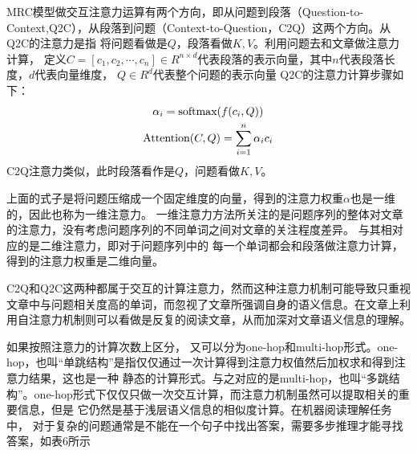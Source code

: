 \documentclass{article}
\newcommand{\upcite}[1]{\textsuperscript{\textsuperscript{\cite{#1}}}}
\begin{document}
MRC模型做交互注意力运算有两个方向，即从问题到段落（Question-to-Context,Q2C），从段落到问题（Context-to-Question，C2Q）这两个方向。从Q2C的注意力是指
将问题看做是$Q$，段落看做$K,V$。利用问题去和文章做注意力计算，
定义$C=[c_1,c_2,\cdots,c_n] \in R^{n\times d}$代表段落的表示向量，其中$n$代表段落长度，$d$代表向量维度，
$Q\in R^{d}$代表整个问题的表示向量
Q2C的注意力计算步骤如下：
\begin{gather}
\alpha_i=\text{softmax}(f(c_i,Q)) \notag \\
\text{Attention}(C,Q)=\sum_{i=1}^{n}\alpha_{i}c_i \notag 
\end{gather}
C2Q注意力类似，此时段落看作是$Q$，问题看做$K,V$。

上面的式子是将问题压缩成一个固定维度的向量，得到的注意力权重$\alpha$也是一维的，因此也称为一维注意力。
一维注意力方法所关注的是问题序列的整体对文章的注意力，没有考虑问题序列的不同单词之间对文章的关注程度差异。
与其相对应的是二维注意力，即对于问题序列中的
每一个单词都会和段落做注意力计算，得到的注意力权重是二维向量。

C2Q和Q2C这两种都属于交互的计算注意力，然而这种注意力机制可能导致只重视文章中与问题相关度高的单词，而忽视了文章所强调自身的语义信息。在文章上利用自注意力机制则可以看做是反复的阅读文章，从而加深对文章语义信息的理解。








如果按照注意力的计算次数上区分，
又可以分为one-hop和multi-hop形式。one-hop，也叫“单跳结构”是指仅仅通过一次计算得到注意力权值然后加权求和得到注意力结果，这也是一种
静态的计算形式。与之对应的是multi-hop，也叫“多跳结构”。one-hop形式下仅仅只做一次交互计算，而注意力机制虽然可以提取相关的重要信息，但是
它仍然是基于浅层语义信息的相似度计算。在机器阅读理解任务中，
对于复杂的问题通常是不能在一个句子中找出答案，需要多步推理才能寻找答案，如表6所示
\end{document}
